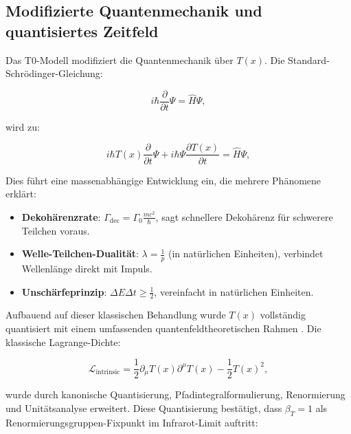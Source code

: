 \documentclass[twocolumn,aps,prl]{revtex4-2}
\begin{document}
		\subsection{Modifizierte Quantenmechanik und quantisiertes Zeitfeld}
		\label{subsec:quantum}
		
		Das T0-Modell modifiziert die Quantenmechanik über $T(x)$. Die Standard-Schrödinger-Gleichung:
		
		\begin{equation}
			i \hbar \frac{\partial}{\partial t} \Psi = \hat{H} \Psi, \label{eq:std_schrodinger}
		\end{equation}
		
		wird zu:
		
		\begin{equation}
			i \hbar T(x) \frac{\partial}{\partial t} \Psi + i \hbar \Psi \frac{\partial T(x)}{\partial t} = \hat{H} \Psi, \label{eq:mod_schrodinger}
		\end{equation}
		
		Dies führt eine massenabhängige Entwicklung ein, die mehrere Phänomene erklärt:
		
		\begin{itemize}
			\item \textbf{Dekohärenzrate}: $\Gamma_{\text{dec}} = \Gamma_0 \frac{m c^2}{\hbar}$, sagt schnellere Dekohärenz für schwerere Teilchen voraus.
			\item \textbf{Welle-Teilchen-Dualität}: $\lambda = \frac{1}{p}$ (in natürlichen Einheiten), verbindet Wellenlänge direkt mit Impuls.
			\item \textbf{Unschärfeprinzip}: $\Delta E \Delta t \geq \frac{1}{2}$, vereinfacht in natürlichen Einheiten.
		\end{itemize}
		
		Aufbauend auf dieser klassischen Behandlung wurde $T(x)$ vollständig quantisiert mit einem umfassenden quantenfeldtheoretischen Rahmen \cite{pascher_qft_2025}. Die klassische Lagrange-Dichte:
		
		\begin{equation}
			\mathcal{L}_{\text{intrinsic}} = \frac{1}{2} \partial_{\mu} T(x) \partial^{\mu} T(x) - \frac{1}{2} T(x)^2, \label{eq:lagrangian_T}
		\end{equation}
		
		wurde durch kanonische Quantisierung, Pfadintegralformulierung, Renormierung und Unitätsanalyse erweitert. Diese Quantisierung bestätigt, dass $\beta_T = 1$ als Renormierungsgruppen-Fixpunkt im Infrarot-Limit auftritt:
		
\end{document}

